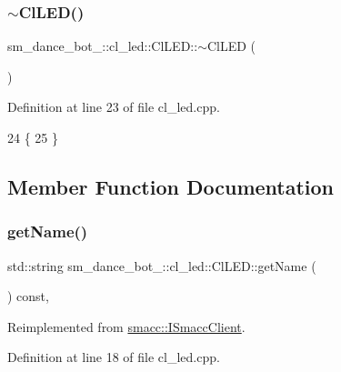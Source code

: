 \subsubsection{\texorpdfstring{$\sim$\+Cl\+L\+E\+D()}{~ClLED()}}
{\footnotesize\ttfamily sm\+\_\+dance\+\_\+bot\+\_\+::cl\+\_\+led\+::\+Cl\+L\+E\+D\+::$\sim$\+Cl\+L\+ED (\begin{DoxyParamCaption}{ }\end{DoxyParamCaption})\hspace{0.3cm}{\ttfamily [virtual]}}



Definition at line 23 of file cl\+\_\+led.\+cpp.


\begin{DoxyCode}
24 \{
25 \}
\end{DoxyCode}


\subsection{Member Function Documentation}
\mbox{\label{classsm__dance__bot__2_1_1cl__led_1_1ClLED_a8d0ff178a2228a1b1c32142987f860dc}} 
\subsubsection{\texorpdfstring{get\+Name()}{getName()}}
{\footnotesize\ttfamily std\+::string sm\+\_\+dance\+\_\+bot\+\_\+::cl\+\_\+led\+::\+Cl\+L\+E\+D\+::get\+Name (\begin{DoxyParamCaption}{ }\end{DoxyParamCaption}) const\hspace{0.3cm}{\ttfamily [override]}, {\ttfamily [virtual]}}



Reimplemented from \hyperlink{classsmacc_1_1ISmaccClient_a8c3ce19f182e71909c5dc6263d25be69}{smacc\+::\+I\+Smacc\+Client}.



Definition at line 18 of file cl\+\_\+led.\+cpp.


